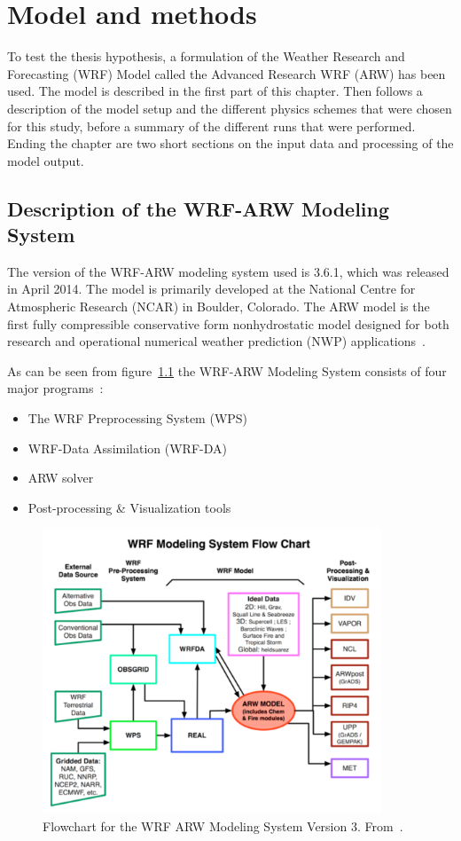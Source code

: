 \chapter{Model and methods}
\label{chap:modmet}
To test the thesis hypothesis, a formulation of the Weather Research and Forecasting (WRF) Model called the Advanced Research WRF (ARW) has been used. The model is described in the first part of this chapter. Then follows a description of the model setup and the different physics schemes that were chosen for this study, before a summary of the different runs that were performed. Ending the chapter are two short sections on the input data and processing of the model output.

\section{Description of the WRF-ARW Modeling System}
\label{sec:modeldes}
The version of the WRF-ARW modeling system used is 3.6.1, which was released in April 2014. The model is primarily developed at the National Centre for Atmospheric Research (NCAR) in Boulder, Colorado. The ARW model is the first fully compressible conservative form nonhydrostatic model designed for both research and operational numerical weather prediction (NWP) applications~\citep{Skamarock2008}. 

As can be seen from figure~\ref{fig:wrfflowchart} the WRF-ARW Modeling System consists of four major programs~\citep{Wang2015}:
\begin{itemize}
\item The WRF Preprocessing System (WPS)
\item WRF-Data Assimilation (WRF-DA)
\item ARW solver
\item Post-processing \& Visualization tools
\end{itemize}

\begin{figure}[ht]
\centering
\includegraphics[width=0.9\textwidth]{model_methods/wrfflowchart}
\caption{Flowchart for the WRF ARW Modeling System Version 3. From~\citet{Wang2015}.}
\label{fig:wrfflowchart}
\end{figure}

